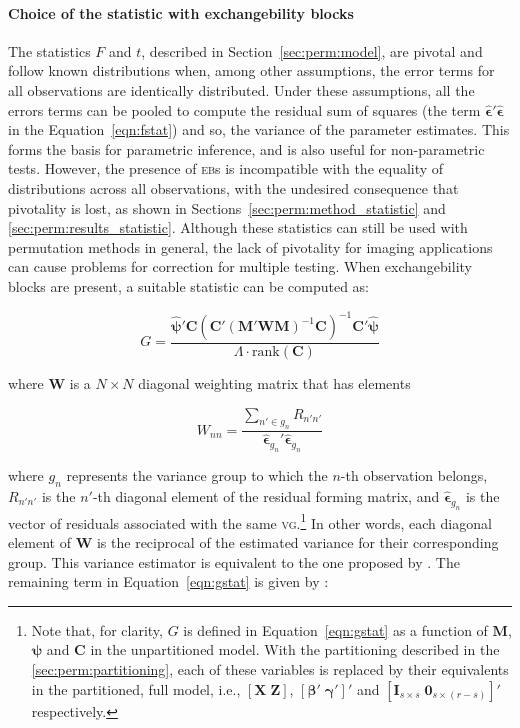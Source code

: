 \paragraph{Choice of the statistic with exchangebility blocks} The statistics $F$ and $t$, described in Section~\ref{sec:perm:model}, are pivotal and follow known distributions when, among other assumptions, the error terms for all observations are identically distributed. Under these assumptions, all the errors terms can be pooled to compute the residual sum of squares (the term $\boldsymbol{\hat{\epsilon}}'\boldsymbol{\hat{\epsilon}}$ in the Equation~\ref{eqn:fstat}) and so, the variance of the parameter estimates. This forms the basis for parametric inference, and is also useful for non-parametric tests. However, the presence of \textsc{eb}s is incompatible with the equality of distributions across all observations, with the undesired consequence that pivotality is lost, as shown in Sections~\ref{sec:perm:method_statistic} and \ref{sec:perm:results_statistic}. Although these statistics can still be used with permutation methods in general, the lack of pivotality for imaging applications can cause problems for correction for multiple testing. When exchangebility blocks are present, a suitable statistic can be computed as:

\begin{equation}
G = \dfrac{\boldsymbol{\hat{\psi}}'\mathbf{C} \left(\mathbf{C}'(\mathbf{M}'\mathbf{W}\mathbf{M})^{-1}\mathbf{C} \right)^{-1} \mathbf{C}'\boldsymbol{\hat{\psi}}}{\Lambda \cdot \mathrm{rank}\left(\mathbf{C}\right)}
\label{eqn:gstat}
\end{equation}

\noindent
where $\mathbf{W}$ is a $N \times N$ diagonal weighting matrix that has elements

\begin{equation}
W_{nn} = \dfrac{\sum_{n' \in g_{n}}R_{n'n'}}{\boldsymbol{\hat{\epsilon}}_{g_{n}}'\boldsymbol{\hat{\epsilon}}_{g_{n}}}
\end{equation}

\noindent where $g_{n}$ represents the variance group to which the $n$-th observation belongs, $R_{n'n'}$ is the $n'$-th diagonal element of the residual forming matrix, and $\boldsymbol{\hat{\epsilon}}_{g_{n}}$ is the vector of residuals associated with the same \textsc{vg}.\footnote{Note that, for clarity, $G$ is defined in Equation~\ref{eqn:gstat} as a function of $\mathbf{M}$, $\boldsymbol{\psi}$ and $\mathbf{C}$ in the unpartitioned model. With the partitioning described in the \ref{sec:perm:partitioning}, each of these variables is replaced by their equivalents in the partitioned, full model, i.e., $[\mathbf{X} \; \mathbf{Z}]$, $[\boldsymbol{\beta}' \; \boldsymbol{\gamma}']'$ and $[\mathbf{I}_{s \times s}\;\mathbf{0}_{s \times (r-s)}]'$ respectively.} In other words, each diagonal element of $\mathbf{W}$ is the reciprocal of the estimated variance for their corresponding group. This variance estimator is equivalent to the one proposed by \citet{Horn1975}. The remaining term in Equation~\ref{eqn:gstat} is given by \citep{Welch1951}:

